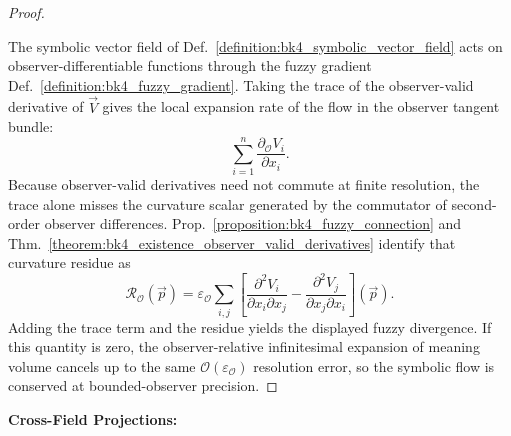 \begin{proof}
\label{proof:bk4_fuzzy_divergence}
\leavevmode

The symbolic vector field of Def.~\ref{definition:bk4_symbolic_vector_field}
acts on observer-differentiable functions through the fuzzy gradient
Def.~\ref{definition:bk4_fuzzy_gradient}. Taking the trace of the
observer-valid derivative of $\vec V$ gives the local expansion rate of the
flow in the observer tangent bundle:
\[
\sum_{i=1}^n \frac{\partial_{\mathcal O}V_i}{\partial x_i}.
\]
Because observer-valid derivatives need not commute at finite resolution, the
trace alone misses the curvature scalar generated by the commutator of
second-order observer differences. Prop.~\ref{proposition:bk4_fuzzy_connection}
and Thm.~\ref{theorem:bk4_existence_observer_valid_derivatives} identify that
curvature residue as
\[
\mathcal R_{\mathcal O}(\vec p)
=
\varepsilon_{\mathcal O}\sum_{i,j}
\left[
\frac{\partial^2V_i}{\partial x_i\partial x_j}
-
\frac{\partial^2V_j}{\partial x_j\partial x_i}
\right](\vec p).
\]
Adding the trace term and the residue yields the displayed fuzzy divergence.
If this quantity is zero, the observer-relative infinitesimal expansion of
meaning volume cancels up to the same $\mathcal O(\varepsilon_{\mathcal O})$
resolution error, so the symbolic flow is conserved at bounded-observer
precision.
\end{proof}


\vspace{1em}
\textbf{Cross-Field Projections:}

